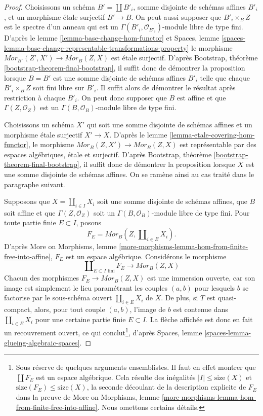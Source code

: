 \begin{proof}
Choisissons un schéma $B' = \coprod B'_i$, somme disjointe de
schémas affines $B'_i$, et un morphisme étale surjectif $B' \to B$.
On peut aussi supposer que $B'_i \times_B Z$ est le spectre d'un anneau
qui est un $\Gamma(B'_i, \mathcal{O}_{B'_i})$-module libre de type fini.
D'après le
lemme \ref{lemma-base-change-hom-functor}
et
Spaces, lemme
\ref{spaces-lemma-base-change-representable-transformations-property}
le morphisme $\mathit{Mor}_{B'}(Z', X') \to \mathit{Mor}_B(Z, X)$
est étale surjectif. D'après
Bootstrap, théorème \ref{bootstrap-theorem-final-bootstrap},
il suffit donc de démontrer la proposition lorsque $B = B'$ est une somme disjointe de
schémas affines $B'_i$ telle que chaque $B'_i \times_B Z$ soit fini libre
sur $B'_i$. Il suffit alors de démontrer le résultat après restriction
à chaque $B'_i$. On peut donc supposer que $B$ est affine et que
$\Gamma(Z, \mathcal{O}_Z)$ est un $\Gamma(B, \mathcal{O}_B)$-module libre de type fini.

\medskip\noindent
Choisissons un schéma $X'$ qui soit une somme disjointe de schémas affines et
un morphisme étale surjectif $X' \to X$. D'après le
lemme \ref{lemma-etale-covering-hom-functor},
le morphisme $\mathit{Mor}_B(Z, X') \to \mathit{Mor}_B(Z, X)$
est représentable par des espaces algébriques, étale et surjectif.
D'après
Bootstrap, théorème \ref{bootstrap-theorem-final-bootstrap},
il suffit donc de démontrer la proposition lorsque $X$ est une somme disjointe
de schémas affines. On se ramène ainsi au cas traité dans le paragraphe
suivant.

\medskip\noindent
Supposons que $X = \coprod_{i \in I} X_i$ soit une somme disjointe de schémas
affines, que $B$ soit affine et que $\Gamma(Z, \mathcal{O}_Z)$ soit un
$\Gamma(B, \mathcal{O}_B)$-module libre de type fini. Pour toute partie finie
$E \subset I$, posons
$$
F_E = \mathit{Mor}_B(Z, \coprod\nolimits_{i \in E} X_i).
$$
D'après More on Morphisms,
lemme \ref{more-morphisms-lemma-hom-from-finite-free-into-affine},
$F_E$ est un espace algébrique. Considérons le morphisme
$$
\coprod\nolimits_{E \subset I\text{ fini}} F_E
\longrightarrow
\mathit{Mor}_B(Z, X)
$$
Chacun des morphismes
$F_E \to \mathit{Mor}_B(Z, X)$ est une immersion ouverte, car son image est
simplement le lieu paramétrant les couples $(a, b)$ pour lesquels $b$ se factorise par
le sous-schéma ouvert $\coprod\nolimits_{i \in E} X_i$ de $X$. De plus,
si $T$ est quasi-compact, alors, pour tout couple $(a, b)$, l'image
de $b$ est contenue dans $\coprod\nolimits_{i \in E} X_i$ pour une certaine partie
finie $E \subset I$. La flèche affichée est donc en fait un
recouvrement ouvert, ce qui conclut\footnote{Sous réserve de
quelques arguments ensemblistes. Il faut en effet montrer que
$\coprod F_E$ est un espace algébrique. Cela résulte des inégalités
$|I| \leq \text{size}(X)$ et $\text{size}(F_E) \leq \text{size}(X)$,
la seconde découlant de la description explicite de $F_E$ dans la preuve de
More on Morphisms,
lemme \ref{more-morphisms-lemma-hom-from-finite-free-into-affine}.
Nous omettons certains détails.}, d'après
Spaces, lemme \ref{spaces-lemma-glueing-algebraic-spaces}.
\end{proof}
